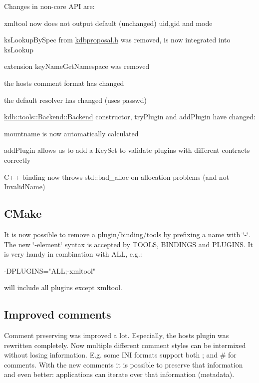 Changes in non-\/core A\+PI are\+:


\begin{DoxyItemize}
\item xmltool now does not output default (unchanged) uid,gid and mode
\item ks\+Lookup\+By\+Spec from \hyperlink{kdbproposal_8h}{kdbproposal.\+h} was removed, is now integrated into ks\+Lookup
\item extension key\+Name\+Get\+Namespace was removed
\item the hosts comment format has changed
\item the default resolver has changed (uses passwd)
\item \hyperlink{classkdb_1_1tools_1_1Backend_a1650b149ebf313ee8cd3472247212263}{kdb\+::tools\+::\+Backend\+::\+Backend} constructor, try\+Plugin and add\+Plugin have changed\+:
\begin{DoxyItemize}
\item mountname is now automatically calculated
\item add\+Plugin allows us to add a Key\+Set to validate plugins with different contracts correctly
\end{DoxyItemize}
\item C++ binding now throws std\+::bad\+\_\+alloc on allocation problems (and not Invalid\+Name)
\end{DoxyItemize}

\subsection*{C\+Make}

It is now possible to remove a plugin/binding/tools by prefixing a name with \char`\"{}-\/\char`\"{}. The new \char`\"{}-\/element\char`\"{} syntax is accepted by T\+O\+O\+LS, B\+I\+N\+D\+I\+N\+GS and P\+L\+U\+G\+I\+NS. It is very handy in combination with A\+LL, e.\+g.\+: \begin{DoxyVerb}-DPLUGINS="ALL;-xmltool"
\end{DoxyVerb}


will include all plugins except xmltool.

\subsection*{Improved comments}

Comment preserving was improved a lot. Especially, the hosts plugin was rewritten completely. Now multiple different comment styles can be intermixed without losing information. E.\+g. some I\+NI formats support both ; and \# for comments. With the new comments it is possible to preserve that information and even better\+: applications can iterate over that information (metadata).

